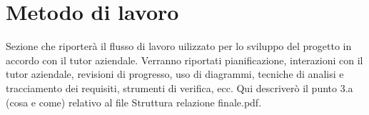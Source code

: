 \section{Metodo di lavoro}

Sezione che riporterà il flusso di lavoro uilizzato per lo sviluppo del progetto in accordo con il tutor aziendale.
Verranno riportati pianificazione, interazioni con il tutor aziendale, revisioni di progresso, uso di diagrammi,
tecniche di analisi e tracciamento dei requisiti, strumenti di verifica, ecc.
Qui descriverò il punto 3.a (cosa e come) relativo al file Struttura relazione finale.pdf.
